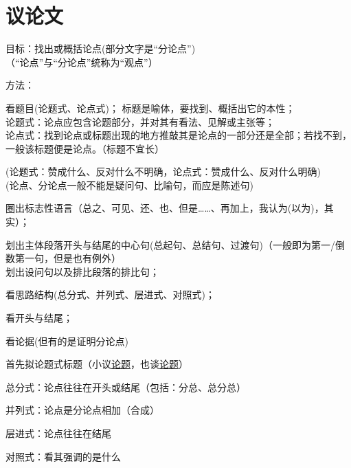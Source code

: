 \section{议论文}
目标：找出或概括论点(部分文字是``分论点'')\\
（``论点''与``分论点''统称为``观点''）\par
方法：\begin{asparaenum}[(1)]\item 看题目(论题式、论点式)；
标题是喻体，要找到、概括出它的本性；\\
论题式：论点应包含论题部分，并对其有看法、见解或主张等；\\
论点式：找到论点或标题出现的地方推敲其是论点的一部分还是全部；若找不到，一般该标题便是论点。（标题不宜长）\par
(论题式：赞成什么、反对什么不明确，论点式：赞成什么、反对什么明确)\\
(论点、分论点一般不能是疑问句、比喻句，而应是陈述句)

\item 圈出标志性语言（总之、可见、还、也、但是\ldots{}\ldots{}、再加上，我认为(以为)，其实）；
\item 划出主体段落开头与结尾的中心句(总起句、总结句、过渡句)（一般即为第一/倒数第一句，但是也有例外）\\划出设问句以及排比段落的排比句；
\item 看思路结构(总分式、并列式、层进式、对照式)；
\item 看开头与结尾；
\item 看论据(但有的是证明分论点)
\end{asparaenum}

\begin{asparaenum}
\item 首先拟论题式标题（小议\uline{论题}，也谈\uline{论题}）
\end{asparaenum}

\begin{asparaenum}[(1)]
\item 总分式：论点往往在开头或结尾（包括：分总、总分总）
\item 并列式：论点是分论点相加（合成）
\item 层进式：论点往往在结尾
\item 对照式：看其强调的是什么
\end{asparaenum}

